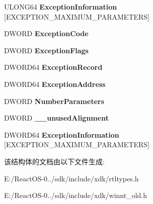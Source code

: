 \begin{DoxyCompactItemize}
U\+L\+O\+N\+G64 {\bfseries Exception\+Information} \mbox{[}E\+X\+C\+E\+P\+T\+I\+O\+N\+\_\+\+M\+A\+X\+I\+M\+U\+M\+\_\+\+P\+A\+R\+A\+M\+E\+T\+E\+RS\mbox{]}
\item 
\mbox{\label{struct___e_x_c_e_p_t_i_o_n___r_e_c_o_r_d64_a4b33bbb311e6695f3ce29962aed7e39d}} 
D\+W\+O\+RD {\bfseries Exception\+Code}
\item 
\mbox{\label{struct___e_x_c_e_p_t_i_o_n___r_e_c_o_r_d64_a38aa5df2aa8206d49372903e819c7390}} 
D\+W\+O\+RD {\bfseries Exception\+Flags}
\item 
\mbox{\label{struct___e_x_c_e_p_t_i_o_n___r_e_c_o_r_d64_a6b21ba307dc3cd3365ddeaa8655fe978}} 
D\+W\+O\+R\+D64 {\bfseries Exception\+Record}
\item 
\mbox{\label{struct___e_x_c_e_p_t_i_o_n___r_e_c_o_r_d64_a38d78e3cf3724768c9170b3c63b8e135}} 
D\+W\+O\+R\+D64 {\bfseries Exception\+Address}
\item 
\mbox{\label{struct___e_x_c_e_p_t_i_o_n___r_e_c_o_r_d64_a5e403107c7baba6ed12fdd186ea010dc}} 
D\+W\+O\+RD {\bfseries Number\+Parameters}
\item 
\mbox{\label{struct___e_x_c_e_p_t_i_o_n___r_e_c_o_r_d64_ac1817214f30ce999a2b51b42a7bbc6bf}} 
D\+W\+O\+RD {\bfseries \+\_\+\+\_\+unused\+Alignment}
\item 
\mbox{\label{struct___e_x_c_e_p_t_i_o_n___r_e_c_o_r_d64_a94bd1c67ddfffc3e39130dfcab8eb131}} 
D\+W\+O\+R\+D64 {\bfseries Exception\+Information} \mbox{[}E\+X\+C\+E\+P\+T\+I\+O\+N\+\_\+\+M\+A\+X\+I\+M\+U\+M\+\_\+\+P\+A\+R\+A\+M\+E\+T\+E\+RS\mbox{]}
\end{DoxyCompactItemize}


该结构体的文档由以下文件生成\+:\begin{DoxyCompactItemize}
\item 
E\+:/\+React\+O\+S-\/0../sdk/include/xdk/rtltypes.\+h\item 
E\+:/\+React\+O\+S-\/0../sdk/include/xdk/winnt\+\_\+old.\+h\end{DoxyCompactItemize}
